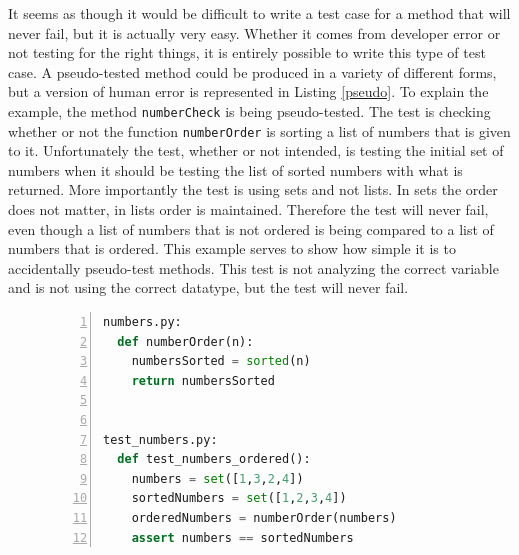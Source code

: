 It seems as though it would be difficult to write a test case for a method that will never fail, but it is actually very easy. Whether it comes from developer error or not testing for the right things, it is entirely possible to write this type of test case.
A pseudo-tested method could be produced in a variety of different forms, but a version of human error is represented in Listing \ref{pseudo}. To explain the example, the method \texttt{numberCheck} is being pseudo-tested. The test is checking whether or not the function \texttt{numberOrder} is sorting a list of numbers that is given to it.  Unfortunately the test, whether or not intended, is testing the initial set of numbers when it should be testing the list of sorted numbers with what is returned. More importantly the test is using sets and not lists. In sets the order does not matter, in lists order is maintained. Therefore the test will never fail, even though a list of numbers that is not ordered is being compared to a list of numbers that is ordered. This example serves to show how simple it is to accidentally pseudo-test methods. This test is not analyzing the correct variable and is not using the correct datatype, but the test will never fail.

\begin{figure}[t!]
\begin{lstlisting}[language = Python, numbers = left, frame = single, caption = Example of a pseudo-tested method, label = pseudo]
numbers.py:
  def numberOrder(n):
    numbersSorted = sorted(n)
    return numbersSorted


test_numbers.py:
  def test_numbers_ordered():
    numbers = set([1,3,2,4])
    sortedNumbers = set([1,2,3,4])
    orderedNumbers = numberOrder(numbers)
    assert numbers == sortedNumbers
\end{lstlisting}
\end{figure}

